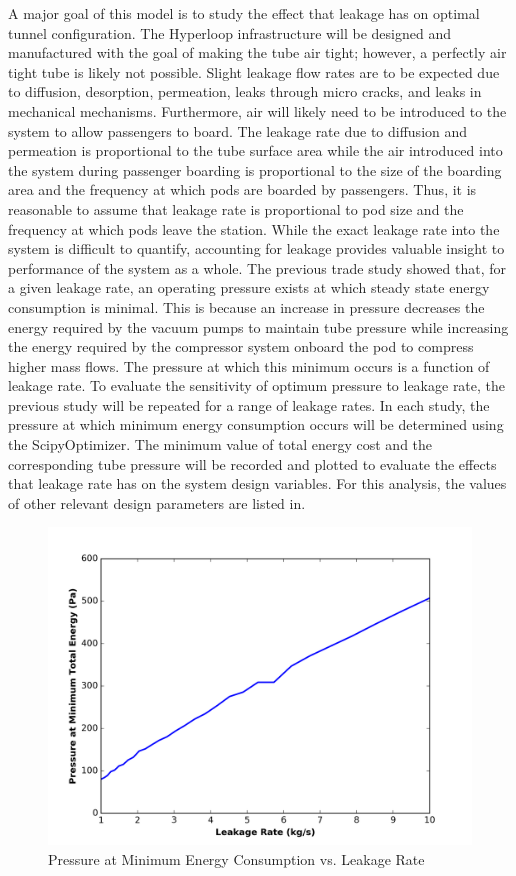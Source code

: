 A major goal of this model is to study the effect that leakage has on optimal tunnel configuration. The Hyperloop infrastructure will be designed and manufactured with the goal of making the tube air tight; however, a perfectly air tight tube is likely not possible. Slight leakage flow rates are to be expected due to diffusion, desorption, permeation, leaks through micro cracks, and leaks in mechanical mechanisms. Furthermore, air will likely need to be introduced to the system to allow passengers to board. The leakage rate due to diffusion and permeation is proportional to the tube surface area while the air introduced into the system during passenger boarding is proportional to the size of the boarding area and the frequency at which pods are boarded by passengers. Thus, it is reasonable to assume that leakage rate is proportional to pod size and the frequency at which pods leave the station. While the exact leakage rate into the system is difficult to quantify, accounting for leakage provides valuable insight to performance of the system as a whole.
The previous trade study showed that, for a given leakage rate, an operating pressure exists at which steady state energy consumption is minimal. This is because an increase in pressure decreases the energy required by the vacuum pumps to maintain tube pressure while increasing the energy required by the compressor system onboard the pod to compress higher mass flows. The pressure at which this minimum occurs is a function of leakage rate. To evaluate the sensitivity of optimum pressure to leakage rate, the previous study will be repeated for a range of leakage rates. In each study, the pressure at which minimum energy consumption occurs will be determined using the ScipyOptimizer. The minimum value of total energy cost and the corresponding tube pressure will be recorded and plotted to evaluate the effects that leakage rate has on the system design variables. For this analysis, the values of other relevant design parameters are listed in.
\begin{figure}
	\centering
	\includegraphics{../../images/graphs/leakage_trades/leakage_vs_pressure.png}
	\caption{Pressure at Minimum Energy Consumption vs. Leakage Rate}
	\label{fig:pres_vs_leakage_rate}
\end{figure}
